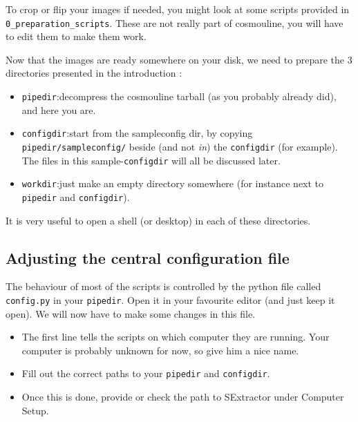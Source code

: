 To crop or flip your images if needed, you might look at some scripts provided in \\ \verb+0_preparation_scripts+. These are not really part of cosmouline, you will have to edit them to make them work.

Now that the images are ready somewhere on your disk, we need to prepare the 3 directories presented in the introduction :

\begin{itemize}

\item \verb+pipedir+:decompress the cosmouline tarball (as you probably already did), and here you are.

\item \verb+configdir+:start from the sampleconfig dir, by copying \verb+pipedir/sampleconfig/+ beside (and not \emph{in}) the \verb+configdir+ (for example). The files in this sample-\verb+configdir+ will all be discussed later.

\item \verb+workdir+:just make an empty directory somewhere (for instance next to \verb+pipedir+ and \verb+configdir+).

\end{itemize}

It is very useful to open a shell (or desktop) in each of these directories.

\subsection{Adjusting the central configuration file}

The behaviour of most of the scripts is controlled by the python file called \verb+config.py+ in your \verb+pipedir+. Open it in your favourite editor (and just keep it open). We will now have to make some changes in this file.

\begin{itemize}
 \item The first line tells the scripts on which computer they are running. Your computer is probably unknown for now, so give him a nice name.
\item Fill out the correct paths to your \verb+pipedir+ and \verb+configdir+.
\item Once this is done, provide or check the path to SExtractor under Computer Setup. 
\end{itemize}


